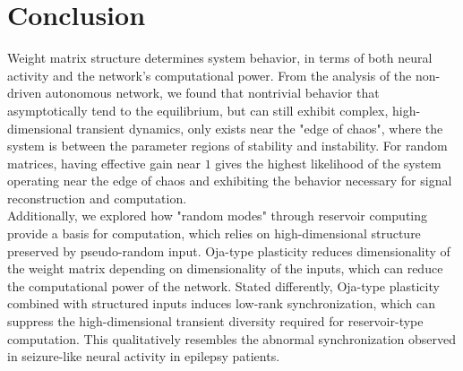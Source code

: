 \documentclass[paper=a4, fontsize=11pt]{scrartcl} %
\numberwithin{equation}{section} %
\numberwithin{figure}{section} %
\numberwithin{table}{section} %
\begin{document}
\section{Conclusion}
Weight matrix structure determines system behavior, in terms of both neural activity and the network's computational power. From the analysis of the non-driven autonomous network, we found that nontrivial behavior that asymptotically tend to the equilibrium, but can still exhibit complex, high-dimensional transient dynamics, only exists near the "edge of chaos", where the system is between the parameter regions of stability and instability. For random matrices, having effective gain near $1$ gives the highest likelihood of the system operating near the edge of chaos and exhibiting the behavior necessary for signal reconstruction and computation.
\vspace{0.5cm}
\\
Additionally, we explored how "random modes" through reservoir computing provide a basis for computation, which relies on high-dimensional structure preserved by pseudo-random input. Oja-type plasticity reduces dimensionality of the weight matrix depending on dimensionality of the inputs, which can reduce the computational power of the network. Stated differently, Oja-type plasticity combined with structured inputs induces low-rank synchronization, which can suppress the high-dimensional transient diversity required for reservoir-type computation. This qualitatively resembles the abnormal synchronization observed in seizure-like neural activity in epilepsy patients.

\clearpage
\nocite{*}


\end{document}
